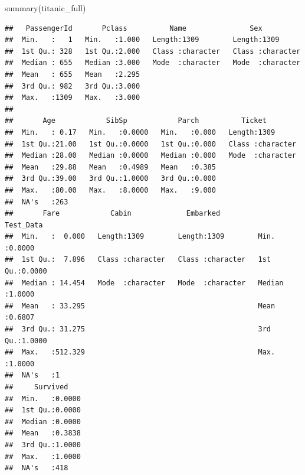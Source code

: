 \documentclass[
]{article}
\newenvironment{Shaded}{\begin{snugshade}}{\end{snugshade}}
\newcommand{\FunctionTok}[1]{\textcolor[rgb]{0.00,0.00,0.00}{#1}}
\newcommand{\NormalTok}[1]{#1}
\begin{document}
\begin{Shaded}
\begin{Highlighting}[]
\FunctionTok{summary}\NormalTok{(titanic\_full)　}
\end{Highlighting}
\end{Shaded}

\begin{verbatim}
##   PassengerId       Pclass          Name               Sex           
##  Min.   :   1   Min.   :1.000   Length:1309        Length:1309       
##  1st Qu.: 328   1st Qu.:2.000   Class :character   Class :character  
##  Median : 655   Median :3.000   Mode  :character   Mode  :character  
##  Mean   : 655   Mean   :2.295                                        
##  3rd Qu.: 982   3rd Qu.:3.000                                        
##  Max.   :1309   Max.   :3.000                                        
##                                                                      
##       Age            SibSp            Parch          Ticket         
##  Min.   : 0.17   Min.   :0.0000   Min.   :0.000   Length:1309       
##  1st Qu.:21.00   1st Qu.:0.0000   1st Qu.:0.000   Class :character  
##  Median :28.00   Median :0.0000   Median :0.000   Mode  :character  
##  Mean   :29.88   Mean   :0.4989   Mean   :0.385                     
##  3rd Qu.:39.00   3rd Qu.:1.0000   3rd Qu.:0.000                     
##  Max.   :80.00   Max.   :8.0000   Max.   :9.000                     
##  NA's   :263                                                        
##       Fare            Cabin             Embarked           Test_Data     
##  Min.   :  0.000   Length:1309        Length:1309        Min.   :0.0000  
##  1st Qu.:  7.896   Class :character   Class :character   1st Qu.:0.0000  
##  Median : 14.454   Mode  :character   Mode  :character   Median :1.0000  
##  Mean   : 33.295                                         Mean   :0.6807  
##  3rd Qu.: 31.275                                         3rd Qu.:1.0000  
##  Max.   :512.329                                         Max.   :1.0000  
##  NA's   :1                                                               
##     Survived     
##  Min.   :0.0000  
##  1st Qu.:0.0000  
##  Median :0.0000  
##  Mean   :0.3838  
##  3rd Qu.:1.0000  
##  Max.   :1.0000  
##  NA's   :418
\end{verbatim}
\end{document}
